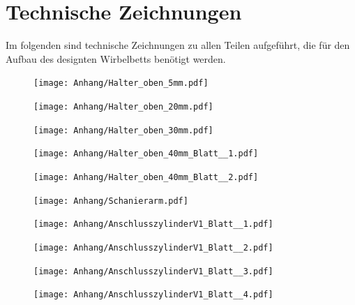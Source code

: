 \clearpage

\section*{Technische Zeichnungen}

Im folgenden sind technische Zeichnungen zu allen Teilen aufgeführt, die für den Aufbau des designten Wirbelbetts benötigt werden.




\begin{figure}  
	\texttt{[image: Anhang/Halter\_oben\_5mm.pdf]}
\end{figure}

\begin{figure}  
	\texttt{[image: Anhang/Halter\_oben\_20mm.pdf]}
\end{figure}

\begin{figure}  
	\texttt{[image: Anhang/Halter\_oben\_30mm.pdf]}
\end{figure}

\begin{figure}  
	\texttt{[image: Anhang/Halter\_oben\_40mm\_Blatt\_\_1.pdf]}
\end{figure}

\begin{figure}  
	\texttt{[image: Anhang/Halter\_oben\_40mm\_Blatt\_\_2.pdf]}
\end{figure}

\begin{figure}  
	\texttt{[image: Anhang/Schanierarm.pdf]}
\end{figure}

\begin{figure}  
	\texttt{[image: Anhang/AnschlusszylinderV1\_Blatt\_\_1.pdf]}
\end{figure}

\begin{figure}  
	\texttt{[image: Anhang/AnschlusszylinderV1\_Blatt\_\_2.pdf]}
\end{figure}

\begin{figure}  
	\texttt{[image: Anhang/AnschlusszylinderV1\_Blatt\_\_3.pdf]}
\end{figure}

\begin{figure}  
	\texttt{[image: Anhang/AnschlusszylinderV1\_Blatt\_\_4.pdf]}
\end{figure}


